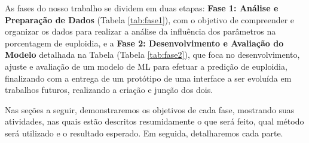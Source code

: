 As fases do nosso trabalho se dividem em duas etapas: \textbf{Fase 1: Análise e Preparação de Dados} (Tabela \ref{tab:fase1}), com o objetivo de compreender e organizar os dados para realizar a análise da influência dos parâmetros na porcentagem de euploidia, e a \textbf{Fase 2: Desenvolvimento e Avaliação do Modelo} detalhada na Tabela (Tabela \ref{tab:fase2}), que foca no desenvolvimento, ajuste e avaliação de um modelo de ML para efetuar a predição de euploidia, finalizando com a entrega de um protótipo de uma interface a ser evoluída em trabalhos futuros, realizando a criação e junção dos dois.

Nas seções a seguir, demonstraremos os objetivos de cada fase, mostrando suas atividades, nas quais estão descritos resumidamente o que será feito, qual método será utilizado e o resultado esperado. Em seguida, detalharemos cada parte.

